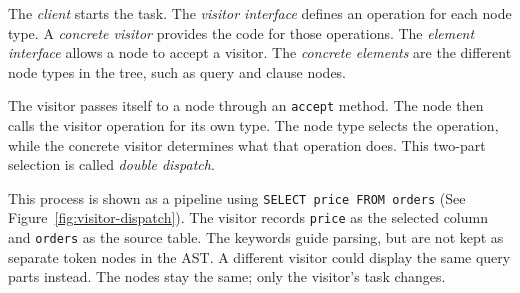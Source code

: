 The \emph{client} starts the task.  The \emph{visitor interface}
defines an operation for each node type.  A \emph{concrete visitor}
provides the code for those operations.  The \emph{element interface}
allows a node to accept a visitor.  The \emph{concrete elements} are
the different node types in the tree, such as query and clause nodes.

The visitor passes itself to a node through an \texttt{accept}
method.  The node then calls the visitor operation for its own type.
The node type selects the operation, while the concrete visitor
determines what that operation does.  This two-part selection is
called \emph{double dispatch}.

This process is shown as a pipeline using \texttt{SELECT price FROM
orders} (See Figure~\ref{fig:visitor-dispatch}).  The visitor records
\texttt{price} as the selected column and \texttt{orders} as the
source table.  The keywords guide parsing, but are not kept as
separate token nodes in the AST.  A different visitor could display
the same query parts instead.  The nodes stay the same; only the
visitor's task changes.

